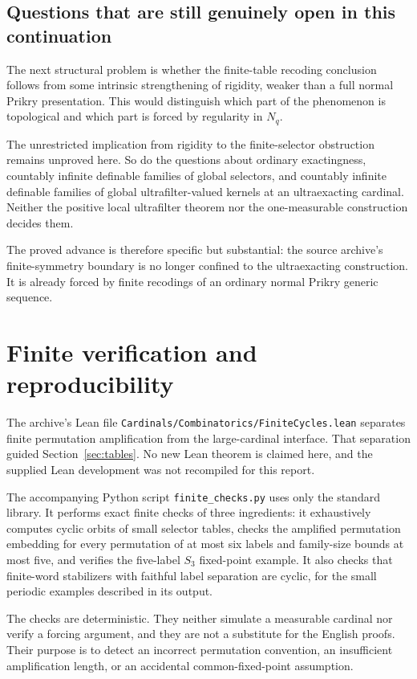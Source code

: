 \documentclass[11pt,letterpaper]{article}
\theoremstyle{definition}
\numberwithin{equation}{section}
\begin{document}
\subsection{Questions that are still genuinely open in this continuation}

The next structural problem is whether the finite-table recoding
conclusion follows from some intrinsic strengthening of rigidity,
weaker than a full normal Prikry presentation. This would distinguish
which part of the phenomenon is topological and which part is forced
by regularity in $N_q$.

The unrestricted implication from rigidity to the finite-selector
obstruction remains unproved here. So do the questions about ordinary
exactingness, countably infinite definable families of global selectors,
and countably infinite definable families of global ultrafilter-valued
kernels at an ultraexacting cardinal. Neither the positive local
ultrafilter theorem nor the one-measurable construction decides them.

The proved advance is therefore specific but substantial: the source
archive's finite-symmetry boundary is no longer confined to the
ultraexacting construction. It is already forced by finite recodings
of an ordinary normal Prikry generic sequence.

\appendix
\section{Finite verification and reproducibility}\label{app:tests}

The archive's Lean file
\nolinkurl{Cardinals/Combinatorics/FiniteCycles.lean} separates finite
permutation amplification from the large-cardinal interface. That
separation guided Section~\ref{sec:tables}. No new Lean theorem is
claimed here, and the supplied Lean development was not recompiled for
this report.

The accompanying Python script \nolinkurl{finite_checks.py} uses only the
standard library. It performs exact finite checks of three ingredients:
it exhaustively computes cyclic orbits of small selector tables, checks
the amplified permutation embedding for every permutation of at most
six labels and family-size bounds at most five, and verifies the
five-label $S_3$ fixed-point example. It also checks that finite-word
stabilizers with faithful label separation are cyclic, for the small
periodic examples described in its output.

The checks are deterministic. They neither simulate a measurable
cardinal nor verify a forcing argument, and they are not a substitute
for the English proofs. Their purpose is to detect an incorrect
permutation convention, an insufficient amplification length, or an
accidental common-fixed-point assumption.
\end{document}
